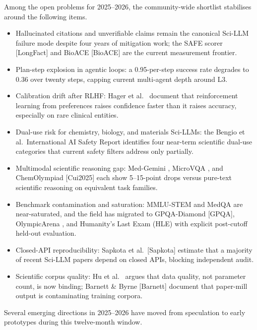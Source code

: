 \documentclass{article}
\begin{document}
Among the open problems for 2025--2026, the community-wide shortlist stabilises around the following items.

\begin{itemize}

\item
  Hallucinated citations and unverifiable claims remain the canonical Sci-LLM failure mode despite four years of mitigation work; the SAFE scorer {[}LongFact{]} and BioACE {[}BioACE{]} are the current measurement frontier.
\item
  Plan-step explosion in agentic loops: a 0.95-per-step success rate degrades to 0.36 over twenty steps, capping current multi-agent depth around L3.
\item
  Calibration drift after RLHF: Hager et al.~\cite{hager2024evaluationandmitig} document that reinforcement learning from preferences raises confidence faster than it raises accuracy, especially on rare clinical entities.
\item
  Dual-use risk for chemistry, biology, and materials Sci-LLMs: the Bengio et al.~International AI Safety Report \cite{bengio2024internationalscien} identifies four near-term scientific dual-use categories that current safety filters address only partially.
\item
  Multimodal scientific reasoning gap: Med-Gemini \cite{yang2024advancingmultimoda}, MicroVQA \cite{burgess2023microvqaamultimoda}, and ChemOlympiad {[}Cui2025{]} each show 5--15-point drops versus pure-text scientific reasoning on equivalent task families.
\item
  Benchmark contamination and saturation: MMLU-STEM and MedQA are near-saturated, and the field has migrated to GPQA-Diamond {[}GPQA{]}, OlympicArena \cite{huang2024olympicarenabenchm}, and Humanity's Last Exam (HLE) with explicit post-cutoff held-out evaluation.
\item
  Closed-API reproducibility: Sapkota et al.~{[}Sapkota{]} estimate that a majority of recent Sci-LLM papers depend on closed APIs, blocking independent audit.
\item
  Scientific corpus quality: Hu et al.~\cite{hu2025asurveyofscientifi} argues that data quality, not parameter count, is now binding; Barnett \& Byrne {[}Barnett{]} document that paper-mill output is contaminating training corpora.
\end{itemize}

Several emerging directions in 2025--2026 have moved from speculation to early prototypes during this twelve-month window.
\end{document}

